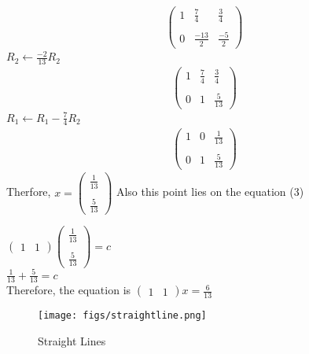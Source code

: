 \documentclass[12pt]{article}
\newcommand{\myvec}[1]{\ensuremath{\begin{pmatrix}#1\end{pmatrix}}}
\begin{document}
\begin{enumerate}
\begin{align}
\begin{pmatrix}
    1 & \frac{7}{4} & \frac{3}{4} \\ \\
    0 & \frac{-13}{2} & \frac{-5}{2}
  \end{pmatrix}
\end{align}
$R_2 \leftarrow \frac{-2}{13}R_2$
\begin{align}
\begin{pmatrix}
    1 & \frac{7}{4} & \frac{3}{4} \\ \\
    0 & 1 & \frac{5}{13}
  \end{pmatrix}
\end{align}
$R_1 \leftarrow R_1-\frac{7}{4}R_2$
\begin{align}
\begin{pmatrix}
    1 & 0 & \frac{1}{13} \\ \\
    0 & 1 & \frac{5}{13}
  \end{pmatrix}
\end{align}
Therfore, $x = \myvec{\frac{1}{13}\\ \\ \frac{5}{13}}$ Also this point lies on the equation (3)\\
\begin{center}
    $\myvec{1 & 1}\myvec{\frac{1}{13} \\ \\ \frac{5}{13}} = c$
    \vspace{\baselineskip}\\
    $\frac{1}{13}+\frac{5}{13} = c$
     \vspace{\baselineskip}\\
    Therefore, the equation is $\myvec{1&1}x=\frac{6}{13}$
\end{center}
\begin{figure}
    \centering
	\texttt{[image: figs/straightline.png]}
    \caption{Straight Lines}
    \label{fig:enter-label}
\end{figure}
\end{enumerate}
\end{document}
